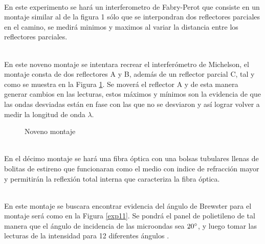 \documentclass[aps,prl,reprint]{revtex4-1}
\begin{document}
\\
En este experimento se hará un interferometro de Fabry-Perot que consiste en un montaje similar al de la figura 1 sólo que se interpondran dos reflectores parciales en el camino, se medirá minimos y maximos al variar la distancia entre los reflectores parciales.

\\

En este noveno montaje se intentara recrear el interferómetro de Michelson, el montaje consta de dos reflectores A y B, además de un reflector parcial C, tal y como se muestra en la Figura \ref{exp9}. Se moverá el reflector A y de esta manera generar cambios en las lecturas, estos máximos y m\'inimos son la evidencia de que las ondas desviadas están en fase con las que no se desviaron y as\'i lograr volver a medir la longitud de onda $\lambda$.

\begin{figure}[H]
\begin{center}
 \caption{Noveno montaje}
 \label{exp9}
 \end{center}
\end{figure}
\\
En el décimo montaje se hará una fibra óptica con una bolsas tubulares llenas de bolitas de estireno que funcionaran como el medio con indice de refracción mayor y permitirán la reflexión total interna que caracteriza la fibra óptica.

\\
En este montaje se buscara encontrar evidencia del ángulo de Brewster para el montaje será como en la Figura \ref{exp11}. Se pondrá el panel de polietileno de tal manera que el ángulo de incidencia de las microondas sea $20\degree$, y luego tomar las lecturas de la intensidad para 12 diferentes ángulos .
\end{document}
